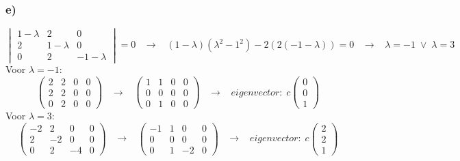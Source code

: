 \documentclass[11pt]{article}
\begin{document}
\subsubsection*{e)}
\[
\begin{vmatrix}
1-\lambda & 2 & 0 \\
2 & 1-\lambda & 0 \\
0 & 2 & -1-\lambda
\end{vmatrix}
=0
\;\;\;\longrightarrow\;\;\;
(1-\lambda)(\lambda^2-1^2) - 2(2(-1-\lambda)) = 0
\;\;\;\longrightarrow\;\;\;
\lambda = -1 \;\vee\; \lambda = 3
\]
Voor $\lambda = -1$: 
\[
\left(
\begin{array}{ccc|c}
2 & 2 & 0 & 0\\
2 & 2 & 0 & 0\\
0 & 2 & 0 & 0
\end{array}
\right)
\;\;\;\longrightarrow\;\;\;
\left(
\begin{array}{ccc|c}
1 & 1 & 0 & 0 \\
0 & 0 & 0 & 0 \\
0 & 1 & 0 & 0
\end{array}
\right)
\;\;\;\longrightarrow\;\;\;
eigenvector:\;
c
\begin{pmatrix}
0\\0\\1
\end{pmatrix}
\]
Voor $\lambda = 3$: 
\[
\left(
\begin{array}{ccc|c}
-2 & 2 & 0 & 0\\
2 & -2 & 0 & 0\\
0 & 2 & -4 & 0
\end{array}
\right)
\;\;\;\longrightarrow\;\;\;
\left(
\begin{array}{ccc|c}
-1 & 1 & 0 & 0 \\
0 & 0 & 0 & 0 \\
0 & 1 & -2 & 0
\end{array}
\right)
\;\;\;\longrightarrow\;\;\;
eigenvector:\;
c
\begin{pmatrix}
2\\2\\1
\end{pmatrix}
\]
\end{document}
